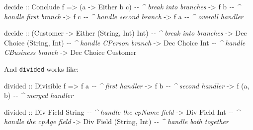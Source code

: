 \documentclass[]{article}
\newenvironment{Shaded}{}{}
\newcommand{\CommentTok}[1]{\textcolor[rgb]{0.38,0.63,0.69}{\textit{#1}}}
\newcommand{\DataTypeTok}[1]{\textcolor[rgb]{0.56,0.13,0.00}{#1}}
\newcommand{\NormalTok}[1]{#1}
\newcommand{\OtherTok}[1]{\textcolor[rgb]{0.00,0.44,0.13}{#1}}
\begin{document}
\begin{Shaded}
\begin{Highlighting}[]
\NormalTok{decide}
\OtherTok{    ::} \DataTypeTok{Conclude}\NormalTok{ f}
    \OtherTok{=\textgreater{}}\NormalTok{ (a }\OtherTok{{-}\textgreater{}} \DataTypeTok{Either}\NormalTok{ b c)    }\CommentTok{{-}{-} \^{} break into branches}
    \OtherTok{{-}\textgreater{}}\NormalTok{ f b                  }\CommentTok{{-}{-} \^{} handle first branch}
    \OtherTok{{-}\textgreater{}}\NormalTok{ f c                  }\CommentTok{{-}{-} \^{} handle second branch}
    \OtherTok{{-}\textgreater{}}\NormalTok{ f a                  }\CommentTok{{-}{-} \^{} overall handler}

\NormalTok{decide}
\OtherTok{    ::}\NormalTok{ (}\DataTypeTok{Customer} \OtherTok{{-}\textgreater{}} \DataTypeTok{Either}\NormalTok{ (}\DataTypeTok{String}\NormalTok{, }\DataTypeTok{Int}\NormalTok{) }\DataTypeTok{Int}\NormalTok{)   }\CommentTok{{-}{-} \^{} break into branches}
    \OtherTok{{-}\textgreater{}} \DataTypeTok{Dec} \DataTypeTok{Choice}\NormalTok{ (}\DataTypeTok{String}\NormalTok{, }\DataTypeTok{Int}\NormalTok{)                 }\CommentTok{{-}{-} \^{} handle CPerson branch}
    \OtherTok{{-}\textgreater{}} \DataTypeTok{Dec} \DataTypeTok{Choice} \DataTypeTok{Int}                           \CommentTok{{-}{-} \^{} handle CBusiness branch}
    \OtherTok{{-}\textgreater{}} \DataTypeTok{Dec} \DataTypeTok{Choice} \DataTypeTok{Customer}
\end{Highlighting}
\end{Shaded}

And \texttt{divided} works like:

\begin{Shaded}
\begin{Highlighting}[]
\NormalTok{divided}
\OtherTok{    ::} \DataTypeTok{Divisible}\NormalTok{ f}
    \OtherTok{=\textgreater{}}\NormalTok{ f a          }\CommentTok{{-}{-} \^{} first handler}
    \OtherTok{{-}\textgreater{}}\NormalTok{ f b          }\CommentTok{{-}{-} \^{} second handler}
    \OtherTok{{-}\textgreater{}}\NormalTok{ f (a, b)     }\CommentTok{{-}{-} \^{} merged handler}

\NormalTok{divided}
\OtherTok{    ::} \DataTypeTok{Div} \DataTypeTok{Field} \DataTypeTok{String}          \CommentTok{{-}{-} \^{} handle the cpName field}
    \OtherTok{{-}\textgreater{}} \DataTypeTok{Div} \DataTypeTok{Field} \DataTypeTok{Int}             \CommentTok{{-}{-} \^{} handle the cpAge field}
    \OtherTok{{-}\textgreater{}} \DataTypeTok{Div} \DataTypeTok{Field}\NormalTok{ (}\DataTypeTok{String}\NormalTok{, }\DataTypeTok{Int}\NormalTok{)   }\CommentTok{{-}{-} \^{} handle both together}
\end{Highlighting}
\end{Shaded}
\end{document}
